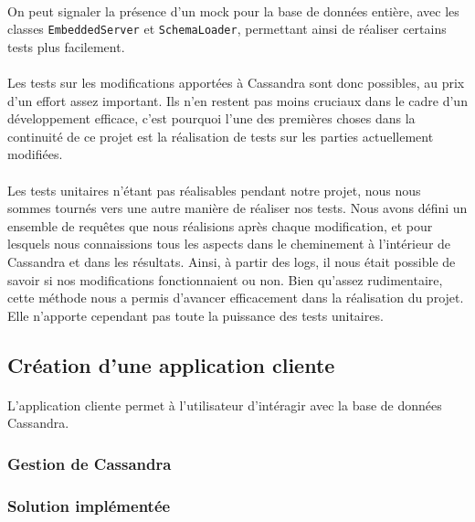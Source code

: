 \documentclass[12pt]{article}
\newcommand{\class}[1]{\texttt{#1}}
\begin{document}
\paragraph{}On peut signaler la présence d'un mock pour la base de données entière, avec les classes \class{EmbeddedServer} et \class{SchemaLoader}, permettant ainsi de réaliser certains tests plus facilement.

\paragraph{}Les tests sur les modifications apportées à Cassandra sont donc possibles, au prix d'un effort assez important. Ils n'en restent pas moins cruciaux dans le cadre d'un développement efficace, c'est pourquoi l'une des premières choses dans la continuité de ce projet est la réalisation de tests sur les parties actuellement modifiées.

\paragraph{}Les tests unitaires n'étant pas réalisables pendant notre projet, nous nous sommes tournés vers une autre manière de réaliser nos tests. Nous avons défini un ensemble de requêtes que nous réalisions après chaque modification, et pour lesquels nous connaissions tous les aspects dans le cheminement à l'intérieur de Cassandra et dans les résultats. Ainsi, à partir des logs, il nous était possible de savoir si nos modifications fonctionnaient ou non. Bien qu'assez rudimentaire, cette méthode nous a permis d'avancer efficacement dans la réalisation du projet. Elle n'apporte cependant pas toute la puissance des tests unitaires.

\subsection{Création d'une application cliente}

\paragraph{} L'application cliente permet à l'utilisateur d'intéragir avec la base de données Cassandra.

\subsubsection{Gestion de Cassandra}

\subsubsection*{Solution implémentée}
\end{document}
